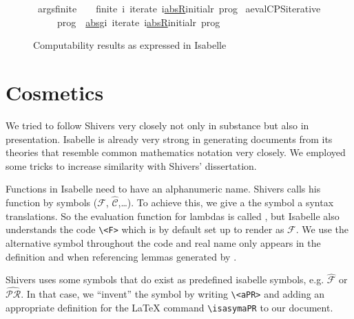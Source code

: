 \documentclass[a4paper,halfparskip,DIV=10,11pt]{scrbook}
\newcommand{\isasymaPR}{\isamath{\widehat{\mathcal{PR}}}}
\newcommand{\F}{\mathcal F}
\newcommand{\aC}{\widehat{\mathcal C}}
\newcommand{\aF}{\widehat{\mathcal F}}
\newcommand{\aPR}{\widehat{\mathcal {PR}}}
\begin{document}
\begin{figure}
\begin{framed}
\begin{isabellebody}%
\isamarkupfalse%
\ args{\isacharunderscore}finite{\isacharcolon}\isanewline\ \ \ \ {\isachardoublequoteopen}finite\ {\isacharparenleft}{\isasymUnion}i{\isachardot}\ iterate\ i{\isasymcdot}{\isacharparenleft}\uline{abs{\isacharunderscore}R}{\isacharparenright}{\isasymcdot}{\isacharbraceleft}initial{\isacharunderscore}r\ prog{\isacharbraceright}{\isacharparenright}{\isachardoublequoteclose}\isanewline
\isanewline
{}\isamarkupfalse%
\ a{\isacharunderscore}evalCPS{\isacharunderscore}iterative{\isacharcolon}\isanewline
\ \ \ \ {\isachardoublequoteopen}{\isasymaPR}\ prog\ {\isacharequal}\ \uline{abs{\isacharunderscore}g}{\isasymcdot}{\isacharparenleft}{\isasymUnion}i{\isachardot}\ iterate\ i{\isasymcdot}{\isacharparenleft}\uline{abs{\isacharunderscore}R}{\isacharparenright}{\isasymcdot}{\isacharbraceleft}initial{\isacharunderscore}r\ prog{\isacharbraceright}{\isacharparenright}{\isachardoublequoteclose}
\end{isabellebody}%
\end{framed}
\caption{Computability results as expressed in Isabelle}
\label{fig:complemmas}
\end{figure}
\section{Cosmetics}
\label{seclayout}

We tried to follow Shivers very closely not only in substance but also in presentation. Isabelle is already very strong in generating documents from its theories that resemble common mathematics notation very closely. We employed some tricks to increase similarity with Shivers’ dissertation.

Functions in Isabelle need to have an alphanumeric name. Shivers calls his function by symbols ($\F$, $\aC$,\ldots). To achieve this, we give a the symbol a syntax translations. So the evaluation function for lambdas is called , but Isabelle also understands the code \texttt{\textbackslash<F>} which is by default set up to render as $\F$. We use the alternative symbol throughout the code and real name  only appears in the definition and when referencing lemmas generated by . 

Shivers uses some symbols that do exist as predefined isabelle symbols, e.g. $\aF$ or $\aPR$. In that case, we “invent” the symbol by writing \texttt{\textbackslash<aPR>} and adding an appropriate definition for the \LaTeX{} command \texttt{\textbackslash isasymaPR} to our document.
\end{document}
